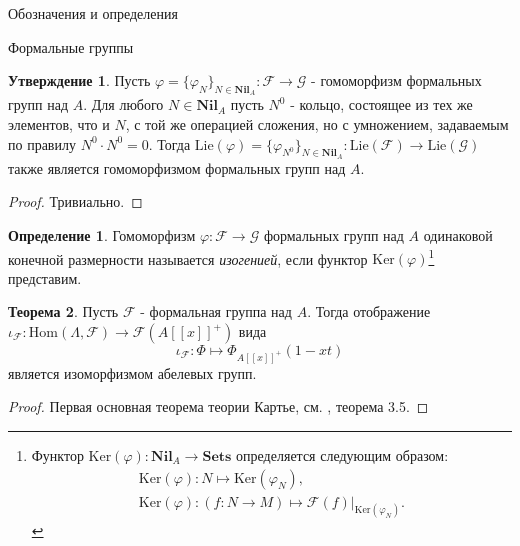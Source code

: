 \documentclass[a4paper,14pt]{extarticle}
\theoremstyle{definition}
\newtheorem{definition}{Определение}[section]
\newtheorem{theorem}{Теорема}[section]
\newtheorem{claim}[theorem]{Утверждение}
\newcommand{\Sets}{\mathbf{Sets}}
\newcommand{\Ker}[1]{\mathrm{Ker}\left(#1\right)}
\newcommand{\Lie}[1]{\mathrm{Lie}\left(#1\right)}
\newcommand{\Nil}[1]{\mathbf{Nil}_{#1}}
\newcommand{\Hom}[2]{\mathrm{Hom}\left(#1, #2\right)}
\newcommand{\sF}{\mathscr{F}}
\newcommand{\sG}{\mathscr{G}}
\begin{document}
\begin{section}{Обозначения и определения}
\begin{subsection}{Формальные группы}
\begin{claim}
    Пусть ${ \varphi = \{ \varphi_N \}_{N \in \Nil{A}} : \sF \rightarrow \sG }$ - гомоморфизм формальных групп над $A$. Для любого ${ N \in \Nil{A} }$ пусть ${ N^0 }$ - кольцо, состоящее из тех же элементов, что и $N$, с той же операцией сложения, но с умножением, задаваемым по правилу ${ N^0 \cdot N^0 = 0 }$. Тогда ${ \Lie{\varphi} = \{ \varphi_{N^0} \}_{N \in \Nil{A}} : \Lie{\sF} \rightarrow \Lie{\sG} }$ также является гомоморфизмом формальных групп над $A$.
\end{claim}
\begin{proof}
    Тривиально.
\end{proof}

\begin{definition}\label{def:3.6:isogeny}
    Гомоморфизм ${ \varphi : \sF \rightarrow \sG }$ формальных групп над $A$ одинаковой конечной размерности называется \textit{изогенией}, если функтор $\Ker{\varphi}$\footnote{
        Функтор ${ \Ker{\varphi} : \Nil{A} \rightarrow \Sets }$ определяется следующим образом:
        \begin{gather*}
            \Ker{\varphi} : N \mapsto \Ker{\varphi_N}, \\
            \Ker{\varphi} :
            (f : N \rightarrow M) \mapsto
            \sF(f)|_{\Ker{\varphi_N}}.
        \end{gather*}
    } представим.
\end{definition}

\begin{theorem}\label{theorem:3.5:first_main_theorem_of_cartier_theory}
    Пусть $\sF$ - формальная группа над $A$. Тогда отображение ${ \iota_\sF : \Hom{\Lambda}{\sF} \rightarrow \sF(A[[x]]^+) }$ вида
    \begin{equation*}
        \iota_\sF :
        \Phi \mapsto
        \Phi_{A[[x]]^+}(1 - x t)
    \end{equation*}
    является изоморфизмом абелевых групп.
\end{theorem}
\begin{proof}
    Первая основная теорема теории Картье, см. \cite{Zink}, теорема 3.5.
\end{proof}


\end{subsection}
\end{section}
\end{document}
